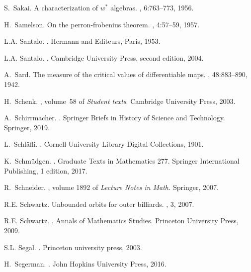 \documentclass[12pt]{amsart}
\begin{document}
\begin{thebibliography}{100}
S.~Sakai.
\newblock A characterization of $w^*$ algebras.
, 6:763--773, 1956.

H.~Samelson.
\newblock On the perron-frobenius theorem.
, 4:57--59, 1957.

L.A. Santalo.
.
\newblock Hermann and Editeurs, Paris, 1953.

L.A. Santalo.
.
\newblock Cambridge University Press, second edition, 2004.

A.~Sard.
\newblock The measure of the critical values of differentiable maps.
, 48:883--890, 1942.

H.~Schenk.
, volume~58 of {\em Student
  texts}.
\newblock Cambridge University Press, 2003.

A.~Schirrmacher.
.
\newblock Springer Briefs in History of Science and Technology. Springer, 2019.

L.~Schl{\"a}fli.
.
\newblock Cornell University Library Digital Collections, 1901.

K.~Schm\"udgen.
.
\newblock Graduate Texts in Mathematics 277. Springer International Publishing,
  1 edition, 2017.

R.~Schneider.
, volume 1892
  of {\em Lecture Notes in Math.}
\newblock Springer, 2007.

R.E. Schwartz.
\newblock Unbounded orbits for outer billiards.
, 3, 2007.

R.E. Schwartz.
.
\newblock Annals of Mathematics Studies. Princeton University Press, 2009.

S.L. Segal.
.
\newblock Princeton university press, 2003.

H.~Segerman.
.
\newblock John Hopkins University Press, 2016.


\end{thebibliography}
\end{document}
